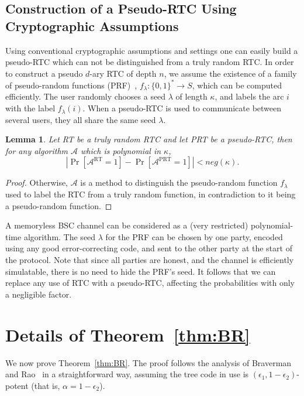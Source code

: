\documentclass[ letterpaper, 11pt]{article}
\newtheorem{lemma}[theorem]{Lemma}
\newcommand{\RTBC}{\textsf{RTC}\xspace}
\begin{document}
\subsection{Construction of a Pseudo-\RTBC Using Cryptographic Assumptions}


Using conventional cryptographic assumptions
and settings one can easily build a pseudo-\RTBC which can not be
distinguished from a truly random \RTBC.
In order to construct a pseudo $d$-ary \RTBC of depth $n$,
we assume the existence of a
family of pseudo-random functions (PRF)~\cite{GGM86}, $f_\lambda: \{0,1\}^* \to S$,
which can be computed efficiently.
The user randomly chooses a seed $\lambda$
of length $\kappa$,
and labels the arc $i$ with the label $f_\lambda(i)$.
When a pseudo-\RTBC is used to communicate between several
users, they all share the same seed $\lambda$.

\begin{lemma}
Let RT be a truly random \RTBC and let PRT be a pseudo-\RTBC, then for
any  algorithm $\mathcal A$ which is polynomial in $\kappa$,
$$
\left |\Pr \left [ \mathcal A^{\text{RT}}=1 \right] - \Pr [\mathcal A^{\text{PRT}}=1] \right | < neg(\kappa )\text{.} 
$$
\end{lemma}
\begin{proof}
Otherwise, $\mathcal A$ is a method to distinguish the
pseudo-random function $f_\lambda$ used to label the
\RTBC from a truly random function, in contradiction to it
being a pseudo-random function.
\end{proof}
A memoryless BSC channel can be considered as a (very restricted) polynomial-time algorithm.
The seed $\lambda$ for the PRF can be chosen by one party,
encoded using any good error-correcting code, and sent to the
other party at the start of the protocol.  Note that since all parties
are honest, and the channel is efficiently simulatable, there is no
need to hide the PRF's seed.
It follows that we can replace any use of \RTBC
with a pseudo-\RTBC, affecting the probabilities with only a negligible factor.




\section{Details of Theorem~\ref{thm:BR}}\label{app:BR}
We now prove Theorem~\ref{thm:BR}.
The proof follows the analysis of Braverman and Rao~\cite{BR10} in a straightforward way,
assuming the tree code in use is $(\epsilon_1,1-\epsilon_2)$-potent (that is, $\alpha=1-\epsilon_2$).
\end{document}
